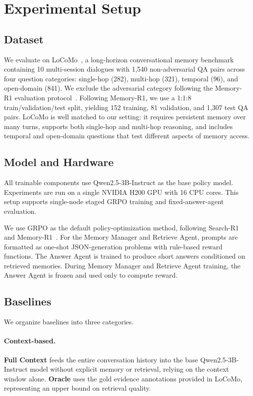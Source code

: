 \section{Experimental Setup}
\subsection{Dataset}
We evaluate on LoCoMo~, a long-horizon conversational memory benchmark containing 10 multi-session dialogues with 1{,}540 non-adversarial QA pairs across four question categories: single-hop (282), multi-hop (321), temporal (96), and open-domain (841). We exclude the adversarial category following the Memory-R1 evaluation protocol~. Following Memory-R1, we use a 1:1:8 train/validation/test split, yielding 152 training, 81 validation, and 1{,}307 test QA pairs. LoCoMo is well matched to our setting: it requires persistent memory over many turns, supports both single-hop and multi-hop reasoning, and includes temporal and open-domain questions that test different aspects of memory access.

\subsection{Model and Hardware}
All trainable components use Qwen2.5-3B-Instruct as the base policy model. Experiments are run on a single NVIDIA H200 GPU with 16 CPU cores. This setup supports single-node staged GRPO training and fixed-answer-agent evaluation.

We use GRPO as the default policy-optimization method, following Search-R1 and Memory-R1~. For the Memory Manager and Retrieve Agent, prompts are formatted as one-shot JSON-generation problems with rule-based reward functions. The Answer Agent is trained to produce short answers conditioned on retrieved memories. During Memory Manager and Retrieve Agent training, the Answer Agent is frozen and used only to compute reward.

\subsection{Baselines}
We organize baselines into three categories.

\paragraph{Context-based.}
\textbf{Full Context} feeds the entire conversation history into the base Qwen2.5-3B-Instruct model without explicit memory or retrieval, relying on the context window alone.
\textbf{Oracle} uses the gold evidence annotations provided in LoCoMo, representing an upper bound on retrieval quality.

